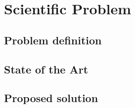\chapter{Scientific Problem}
\label{section:scientificProblem}


\section{Problem definition}
\label{section:problemDefinition}

\section{State of the Art}
\label{section:stateOfTheArt}

\section{Proposed solution}
\label{section:proposedSolution}
